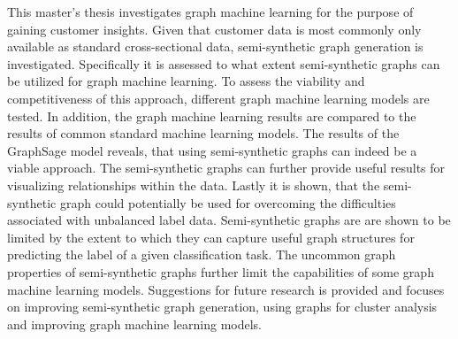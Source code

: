 
  \onehalfspacing

  This master's thesis investigates graph machine learning for the purpose of
  gaining customer insights. Given that customer data is most commonly only
  available as standard cross-sectional data, semi-synthetic graph generation is
  investigated. Specifically it is assessed to what extent semi-synthetic graphs
  can be utilized for graph machine learning. To assess the viability and
  competitiveness of this approach, different graph machine learning models
  are tested. In addition, the graph machine learning results are compared to
  the results of common standard machine learning models. The results of
  the GraphSage model reveals, that using semi-synthetic graphs can indeed be a
  viable approach. The semi-synthetic graphs can further provide useful results
  for visualizing relationships within the data. Lastly it is shown, that the
  semi-synthetic graph could potentially be used for overcoming the
  difficulties associated with unbalanced label data. Semi-synthetic graphs are 
  are shown to be limited by the extent to which they can capture useful graph 
  structures for predicting the label of a given classification task. The
  uncommon graph properties of semi-synthetic graphs further limit the
  capabilities of some graph machine learning models. Suggestions for future 
  research is provided and focuses on improving semi-synthetic graph generation, 
  using graphs for cluster analysis and improving graph machine learning models.
